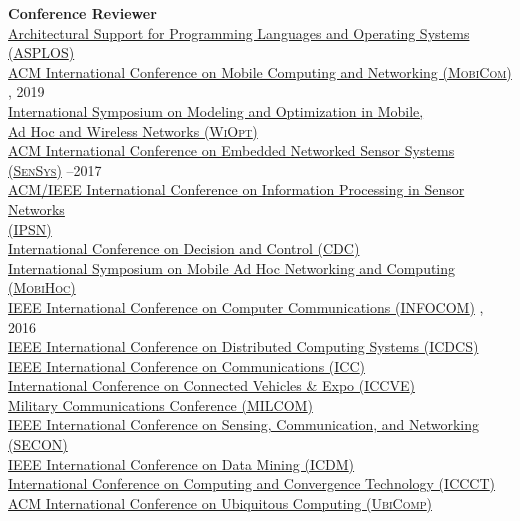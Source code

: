 {\bf Conference Reviewer}\\
{\href{https://asplos-conference.org/2021}{Architectural Support for Programming Languages and Operating Systems (\textsc{ASPLOS})}} \\
{\href{https://sigmobile.org/mobicom/2019/}{ACM International Conference on Mobile Computing and Networking (\textsc{MobiCom})}} , 2019\\
{\href{http://www.wi-opt.org/}{International Symposium on Modeling and Optimization in Mobile, \\\mbox{\hspace{0.6cm}} Ad Hoc and Wireless Networks (\textsc{WiOpt})}} \\
{\href{http://sensys.acm.org}{ACM International Conference on Embedded Networked Sensor Systems (\textsc{SenSys})}} --2017\\
{\href{http://ipsn.acm.org/2017/}{ACM/IEEE International Conference on Information Processing in Sensor Networks \\\mbox{\hspace{0.6cm}} (\textsc{IPSN})}} \\
{\href{http://cdc2016.ieeecss.org/}{International Conference on Decision and Control (\textsc{CDC})}} \\
{\href{http://www.sigmobile.org/mobihoc/2016/}{International Symposium on Mobile Ad Hoc Networking and Computing (\textsc{MobiHoc})}} \\
{\href{http://infocom2016.ieee-infocom.org/}{IEEE International Conference on Computer Communications (\textsc{INFOCOM})}} , 2016\\
{\href{http://icdcs-2015.cse.ohio-state.edu/}{IEEE International Conference on Distributed Computing Systems (\textsc{ICDCS})}} \\
{\href{http://icc2015.ieee-icc.org/}{IEEE International Conference on Communications (\textsc{ICC})}} \\
{\href{http://www.iccve.org/2014/}{International Conference on Connected Vehicles \& Expo (\textsc{ICCVE})}} \\
{\href{http://www.milcom.org/2014/}{Military Communications Conference (\textsc{MILCOM})}} \\
{\href{http://secon2014.ieee-secon.org}{IEEE International Conference on Sensing, Communication, and Networking (\textsc{SECON})}} \\
{\href{http://icdm2013.rutgers.edu}{IEEE International Conference on Data Mining (\textsc{ICDM})}} \\
{\href{http://www.mnnit.ac.in/iccct2013}{International Conference on Computing and Convergence Technology (\textsc{ICCCT})}} \\
{\href{http://www.ubicomp.org/ubicomp2012}{ACM International Conference on Ubiquitous Computing (\textsc{UbiComp})}} \\
\vspace{-0.6cm}

